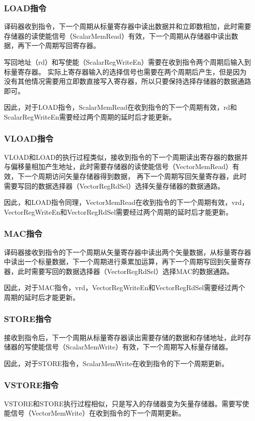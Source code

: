 \documentclass[UTF8]{ctexart}
\begin{document}
\subsubsection{LOAD指令}
译码器收到指令，下一个周期从标量寄存器中读出数据并和立即数相加，此时需要存储器的读使能信号（ScalarMemRead）有效，下一个周期从存储器中读出数据，再下一个周期写回寄存器。

写回地址（rd）和写使能（ScalarRegWriteEn）需要在收到指令两个周期后输入到标量寄存器。
实际上寄存器输入的选择信号也需要在两个周期后产生，但是因为没有其他情况需要用立即数直接写入寄存器，所以只要保持选择存储器的数据通路即可。

因此，对于LOAD指令，ScalarMemRead在收到指令的下一个周期有效，rd和ScalarRegWriteEn需要经过两个周期的延时后才能更新。

\subsubsection{VLOAD指令}
VLOAD和LOAD的执行过程类似，接收到指令的下一个周期读出寄存器的数据并与偏移量相加产生地址，此时需要存储器的读使能信号（VectorMemRead）有效，下一个周期访问矢量存储器得到数据，
再下一个周期写回矢量寄存器，此时需要写回的数据选择器（VectorRegRdSel）选择矢量存储器的数据通路。

因此，和LOAD指令同理，VectorMemRead在收到指令的下一个周期有效，vrd，VectorRegWriteEn和VectorRegRdSel需要经过两个周期的延时后才能更新。

\subsubsection{MAC指令}
译码器接收到指令的下一个周期从矢量寄存器中读出两个矢量数据，从标量寄存器中读出一个标量数据，下一个周期进行乘累加运算，再下一个周期写回到矢量寄存器，此时需要写回的数据选择器（VectorRegRdSel）选择MAC的数据通路。

因此，对于MAC指令，vrd，VectorRegWriteEn和VectorRegRdSel需要经过两个周期的延时后才能更新。

\subsubsection{STORE指令}
接收到指令后，下一个周期从标量寄存器读出需要存储的数据和存储地址，此时存储器的写使能信号（ScalarMemWrite）有效，下一个周期写入标量存储器。

因此，对于STORE指令，ScalarMemWrite在收到指令的下一个周期更新。

\subsubsection{VSTORE指令}
VSTORE和STORE执行过程相似，只是写入的存储器变为矢量存储器。需要写使能信号（VectorMemWrite）在收到指令的下一个周期更新。
\end{document}

